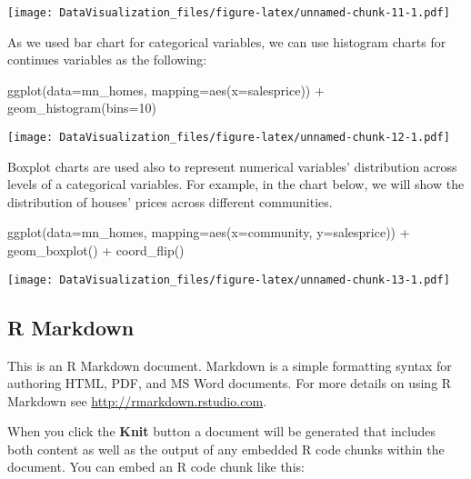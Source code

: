 \documentclass[
]{article}
\newenvironment{Shaded}{\begin{snugshade}}{\end{snugshade}}
\newcommand{\AttributeTok}[1]{\textcolor[rgb]{0.77,0.63,0.00}{#1}}
\newcommand{\DecValTok}[1]{\textcolor[rgb]{0.00,0.00,0.81}{#1}}
\newcommand{\FunctionTok}[1]{\textcolor[rgb]{0.00,0.00,0.00}{#1}}
\newcommand{\NormalTok}[1]{#1}
\newcommand{\SpecialCharTok}[1]{\textcolor[rgb]{0.00,0.00,0.00}{#1}}
\begin{document}
\texttt{[image: DataVisualization\_files/figure-latex/unnamed-chunk-11-1.pdf]}

As we used bar chart for categorical variables, we can use histogram
charts for continues variables as the following:

\begin{Shaded}
\begin{Highlighting}[]
\FunctionTok{ggplot}\NormalTok{(}\AttributeTok{data=}\NormalTok{mn\_homes, }\AttributeTok{mapping=}\FunctionTok{aes}\NormalTok{(}\AttributeTok{x=}\NormalTok{salesprice)) }\SpecialCharTok{+} \FunctionTok{geom\_histogram}\NormalTok{(}\AttributeTok{bins=}\DecValTok{10}\NormalTok{)}
\end{Highlighting}
\end{Shaded}

\texttt{[image: DataVisualization\_files/figure-latex/unnamed-chunk-12-1.pdf]}

Boxplot charts are used also to represent numerical variables'
distribution across levels of a categorical variables. For example, in
the chart below, we will show the distribution of houses' prices across
different communities.

\begin{Shaded}
\begin{Highlighting}[]
\FunctionTok{ggplot}\NormalTok{(}\AttributeTok{data=}\NormalTok{mn\_homes, }\AttributeTok{mapping=}\FunctionTok{aes}\NormalTok{(}\AttributeTok{x=}\NormalTok{community, }\AttributeTok{y=}\NormalTok{salesprice)) }\SpecialCharTok{+} \FunctionTok{geom\_boxplot}\NormalTok{() }\SpecialCharTok{+} \FunctionTok{coord\_flip}\NormalTok{()}
\end{Highlighting}
\end{Shaded}

\texttt{[image: DataVisualization\_files/figure-latex/unnamed-chunk-13-1.pdf]}

\hypertarget{r-markdown}{%
\subsection{R Markdown}\label{r-markdown}}

This is an R Markdown document. Markdown is a simple formatting syntax
for authoring HTML, PDF, and MS Word documents. For more details on
using R Markdown see \url{http://rmarkdown.rstudio.com}.

When you click the \textbf{Knit} button a document will be generated
that includes both content as well as the output of any embedded R code
chunks within the document. You can embed an R code chunk like this:
\end{document}
